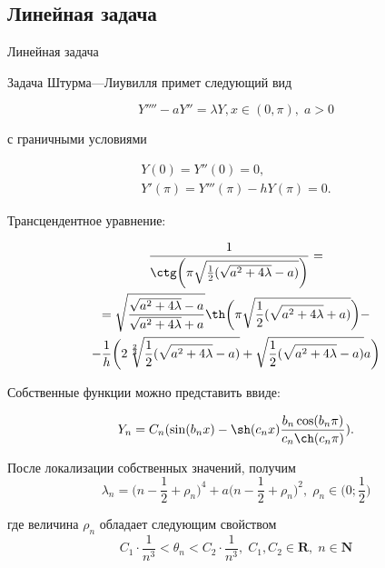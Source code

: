 \documentclass[ignorenonframetext,unicode,handout, 9pt]{beamer}
\numberwithin{equation}{section}
\begin{document}
\subsection{Линейная задача}
\begin{frame}{Линейная задача}

Задача Штурма---Лиувилля примет следующий вид

\begin{equation}\label{task2}
  Y'''' - a Y'' = \lambda Y, x \in (0,\pi),\; a > 0
\end{equation}

с граничными условиями

\begin{gather*}
  Y(0) = Y''(0) = 0  \label{bc21}, \\
  Y'(\pi) = Y'''(\pi) - h Y(\pi) = 0 \label{bc22}.
\end{gather*}

Трансцендентное уравнение:

\begin{multline}\label{tre2}
 \frac{1}{\ctg\bigg(\pi \sqrt{\frac{1}{2}(\sqrt{a^2 + 4 \lambda} - a)}\bigg)} = \\
 =\sqrt{\frac{ \sqrt{a^2 + 4 \lambda} - a}{\sqrt{a^2 + 4 \lambda} + a}}\th\bigg(\pi \sqrt{\frac{1}{2}(\sqrt{a^2 + 4 \lambda} + a)}\bigg) - \\
 - \frac{1}{h}\bigg(2 \sqrt[\frac{2}{3}]{\frac{1}{2}(\sqrt{a^2 + 4 \lambda} - a)} + \sqrt{\frac{1}{2}(\sqrt{a^2 + 4 \lambda} - a)} a\bigg)
\end{multline}

\end{frame}


\begin{frame}

Собственные функции можно представить ввиде:

\begin{equation}
Y_n = C_n (\sin(b_n x) -  \sh(c_n x) \frac{b_n \cos(b_n \pi)}{c_n \ch(c_n \pi)}).
\end{equation}

После локализации собственных значений, получим
\begin{equation}\label{ln}
  \lambda_n = \bigg(n - \frac{1}{2} + \rho_n\bigg)^4 + a\bigg(n - \frac{1}{2} + \rho_n\bigg)^2,\;\rho_n \in \bigg(0;\frac{1}{2}\bigg)
\end{equation}

где величина $\rho_n$ обладает следующим свойством
\begin{equation}\label{thet}
 C_1 \cdot \frac{1}{n^3} < \theta_n < C_2 \cdot \frac{1}{n^3},\; C_1, C_2 \in \textbf{R},\;n \in \textbf{N}
\end{equation}

\end{frame}
\end{document}
